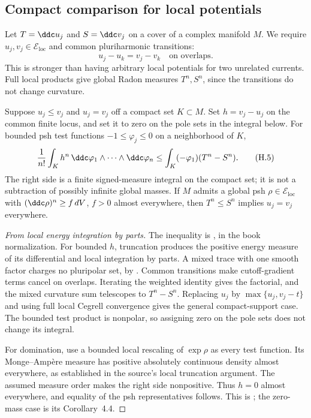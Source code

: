 \subsection{Compact comparison for local potentials}
\label{sec:appH-local-compact-comparison}

Let \(T=\ddc u_j\) and \(S=\ddc v_j\) on a cover of a complex
manifold \(M\). We require \(u_j,v_j\in\mathcal E_{\mathrm{loc}}\)
and common pluriharmonic transitions:
\[
 u_j-u_k=v_j-v_k\quad\text{on overlaps}.
 \tag{H.4}\label{eq:appH-common-local-transitions}
\]
This is stronger than having arbitrary local potentials for two
unrelated currents. Full local products give global Radon measures
\(T^n,S^n\), since the transitions do not change curvature.

\begin{proposition}
\label{prop:appH-local-compact-comparison}
Suppose \(u_j\leq v_j\) and \(u_j=v_j\) off a compact set
\(K\subset M\). Set \(h=v_j-u_j\) on the common finite locus,
and set it to zero on the pole sets in the integral below.
For bounded psh test functions \(-1\leq\varphi_j\leq0\)
on a neighborhood of \(K\),
\[
 \frac1{n!}\int_K h^n\,
       \ddc\varphi_1\wedge\cdots\wedge\ddc\varphi_n
 \leq\int_K(-\varphi_1)(T^n-S^n).
 \tag{H.5}\label{eq:appH-local-compact-weighted}
\]
The right side is a finite signed-measure integral on the compact
set; it is not a subtraction of possibly infinite global masses.
If \(M\) admits a global psh
\(\rho\in\mathcal E_{\mathrm{loc}}\) with
\((\ddc\rho)^n\geq f\,dV\), \(f>0\) almost everywhere,
then \(T^n\leq S^n\) implies \(u_j=v_j\) everywhere.
\end{proposition}

\begin{proof}[From local energy integration by parts]
The inequality is \cite[Proposition~3.3]{DoHiep26LocalComparisonV1},
in the book normalization. For bounded \(h\), truncation produces
the positive energy measure of its differential and local
integration by parts. A mixed trace with one smooth factor charges
no pluripolar set, by \cite[Lemma~4.4]{ACCH08PolarMeasuresV3}.
Common transitions make cutoff-gradient terms cancel on overlaps.
Iterating the weighted identity gives the factorial, and the mixed
curvature sum telescopes to \(T^n-S^n\). Replacing \(u_j\) by
\(\max\{u_j,v_j-t\}\) and using full local Cegrell convergence
gives the general compact-support case. The bounded test product
is nonpolar, so assigning zero on the pole sets does not change
its integral.

For domination, use a bounded local rescaling of
\(\exp\rho\) as every test function. Its Monge--Amp\`ere
measure has positive absolutely continuous density almost
everywhere, as established in the source's local truncation
argument. The assumed measure order makes the right side
nonpositive. Thus \(h=0\) almost everywhere, and equality of
the psh representatives follows. This is
\cite[Lemma~4.3]{DoHiep26LocalComparisonV1}; the zero-mass
case is its Corollary~4.4.
\end{proof}


